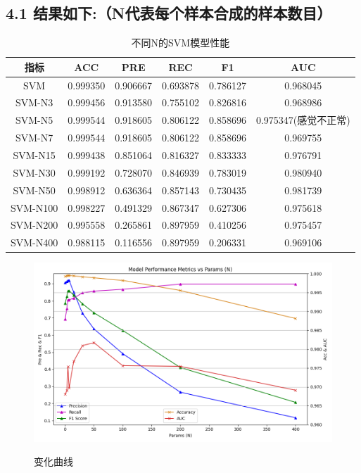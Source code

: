 \documentclass[8pt]{article}
\begin{document}
\subsection*{4.1 结果如下:（N代表每个样本合成的样本数目）}
\begin{table}[H]
    \centering
    \caption{不同N的SVM模型性能}
    \begin{tabular}{cccccc}
    \toprule
    指标 & ACC & PRE & REC & F1 & AUC \\
    \midrule
    SVM & 0.999350 & 0.906667 & 0.693878 & 0.786127 & 0.968045\\
    \midrule
    SVM-N3 & 0.999456 & 0.913580 & 0.755102 & 0.826816 & 0.968986\\
    \midrule
    SVM-N5 & 0.999544 & 0.918605 & 0.806122 & 0.858696 & 0.975347(感觉不正常)\\
    \midrule
    SVM-N7 & 0.999544 & 0.918605 & 0.806122 & 0.858696 & 0.969755\\
    \midrule
    SVM-N15 & 0.999438 & 0.851064 & 0.816327 & 0.833333 & 0.976791\\
    \midrule
    SVM-N30 & 0.999192 & 0.728070 & 0.846939 & 0.783019 & 0.980940\\
    \midrule
    SVM-N50 & 0.998912 & 0.636364 & 0.857143 & 0.730435 & 0.981739\\
    \midrule
    SVM-N100 & 0.998227 & 0.491329 & 0.867347 & 0.627306 & 0.975618\\
    \midrule
    SVM-N200 & 0.995558 & 0.265861 & 0.897959 & 0.410256 & 0.975457\\
    \midrule
    SVM-N400 & 0.988115 & 0.116556 & 0.897959 & 0.206331 & 0.969106\\
    \bottomrule
    \end{tabular}
\end{table}
\begin{figure}[H]
    \centering
    \begin{minipage}{\textwidth}
        \centering
        \includegraphics[width=\textwidth]{../Prob1/out/rand_seed_14/task3/Metrics_curve_N_0_3_5_7_15_30_50_100_200_400.png}
        \label{fig:Metrics_curve_N_0_3_5_7_15_30_50_100_200_400}
        \caption{变化曲线}
    \end{minipage}
\end{figure}
\end{document}
